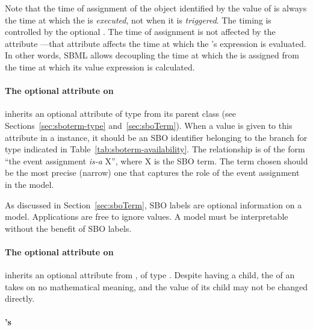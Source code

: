 Note that the time of assignment of the object identified by the
value of  is always the time at which the \Event
is \emph{executed}, not when it is \emph{triggered}.  The timing
is controlled by the optional \Delay.  The time of assignment is
not affected by the \Event attribute
---that attribute affects the time
at which the \EventAssignment's  expression is
evaluated.  In other words, SBML allows decoupling the time at
which the  is assigned from the time at which its
value expression is calculated.


\paragraph{The optional  attribute on }
\label{sec:eventassignment-sboterm}

\EventAssignment inherits an optional 
attribute of type  from its parent
class \SBase (see Sections~\ref{sec:sboterm-type}
and~\ref{sec:sboTerm}).  When a value is given to this
attribute in a  \EventAssignment  instance, it should be an
SBO identifier belonging to the branch for type  \EventAssignment 
indicated in Table~\ref{tab:sboterm-availability}.  The relationship is
of the form ``the event assignment \emph{is-a} X'', where X is
the SBO term.  The term chosen should be the most precise (narrow)
one that captures the role of the event assignment  in the model.

As discussed in Section~\ref{sec:sboTerm}, SBO labels are optional
information on a model.  Applications are free to ignore
 values.  A model must be interpretable without the
benefit of SBO labels.


\begin{blockChanged}
\paragraph{The optional  attribute on }
\label{sec:eventassignment-id}

\EventAssignment inherits an optional  attribute from \SBase, of type .  Despite having a  child, the  of an \EventAssignment takes on no mathematical meaning, and the value of its  child may not be changed directly.
\end{blockChanged}


\paragraph{'s }


